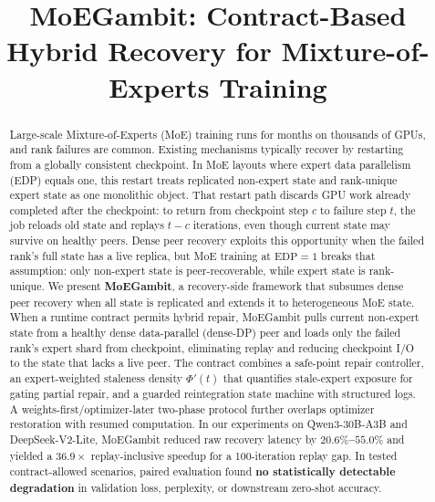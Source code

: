 \documentclass[10pt,conference]{IEEEtran}
\begin{document}
\title{MoEGambit: Contract-Based Hybrid Recovery for Mixture-of-Experts Training}

\author{
\and
{}
}

\maketitle

\begin{abstract}
Large-scale Mixture-of-Experts (MoE) training runs for months on thousands of GPUs, and rank failures are common. Existing mechanisms typically recover by restarting from a globally consistent checkpoint. In MoE layouts where expert data parallelism (EDP) equals one, this restart treats replicated non-expert state and rank-unique expert state as one monolithic object.
That restart path discards GPU work already completed after the checkpoint: to return from checkpoint step $c$ to failure step $t$, the job reloads old state and replays $t-c$ iterations, even though current state may survive on healthy peers. Dense peer recovery exploits this opportunity when the failed rank's full state has a live replica, but MoE training at $\text{EDP}=1$ breaks that assumption: only non-expert state is peer-recoverable, while expert state is rank-unique.
We present \textbf{MoEGambit}, a recovery-side framework that subsumes dense peer recovery when all state is replicated and extends it to heterogeneous MoE state. When a runtime contract permits hybrid repair, MoEGambit pulls current non-expert state from a healthy dense data-parallel (dense-DP) peer and loads only the failed rank's expert shard from checkpoint, eliminating replay and reducing checkpoint I/O to the state that lacks a live peer.
The contract combines a safe-point repair controller, an expert-weighted staleness density $\Phi'(t)$ that quantifies stale-expert exposure for gating partial repair, and a guarded reintegration state machine with structured logs. A weights-first/optimizer-later two-phase protocol further overlaps optimizer restoration with resumed computation.
In our experiments on Qwen3-30B-A3B and DeepSeek-V2-Lite, MoEGambit reduced raw recovery latency by \textbf{$20.6\%$--$55.0\%$} and yielded a \textbf{$36.9\times$} replay-inclusive speedup for a 100-iteration replay gap. In tested contract-allowed scenarios, paired evaluation found \textbf{no statistically detectable degradation} in validation loss, perplexity, or downstream zero-shot accuracy.
\end{abstract}
\end{document}
